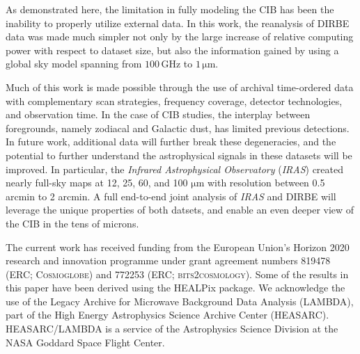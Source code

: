 \documentclass{aa}
\begin{document}
As demonstrated here, the limitation in fully modeling the CIB has been the inability to properly utilize external data. In this work, the reanalysis of DIRBE data was made much simpler not only by the large increase of relative computing power with respect to dataset size, but also the information gained by using a global sky model spanning from $100\,\mathrm{GHz}$ to $1\,\mathrm{\mu m}$.

Much of this work is made possible through the use of archival time-ordered data with complementary scan strategies, frequency coverage, detector technologies, and observation time. In the case of CIB studies, the interplay between foregrounds, namely zodiacal and Galactic dust, has limited previous detections. In future work, additional data will further break these degeneracies, and the potential to further understand the astrophysical signals in these datasets will be improved. In particular, the \textit{Infrared Astrophysical Observatory} (\textit{IRAS}) created nearly full-sky maps at 12, 25, 60, and 100 $\mathrm{\mu m}$ with resolution between 0.5 arcmin to 2 arcmin. A full end-to-end joint analysis of \textit{IRAS} and DIRBE will leverage the unique properties of both datsets, and enable an even deeper view of the CIB in the tens of microns.

\begin{acknowledgements}
 The current work has received funding from the European
  Union’s Horizon 2020 research and innovation programme under grant
  agreement numbers 819478 (ERC; \textsc{Cosmoglobe}) and 772253 (ERC;
  \textsc{bits2cosmology}). Some of the results in this paper have been derived using the HEALPix \citep{healpix} package.
  We acknowledge the use of the Legacy Archive for Microwave Background Data
  Analysis (LAMBDA), part of the High Energy Astrophysics Science Archive Center
  (HEASARC). HEASARC/LAMBDA is a service of the Astrophysics Science Division at
  the NASA Goddard Space Flight Center.  
\end{acknowledgements}


%



\end{document}
